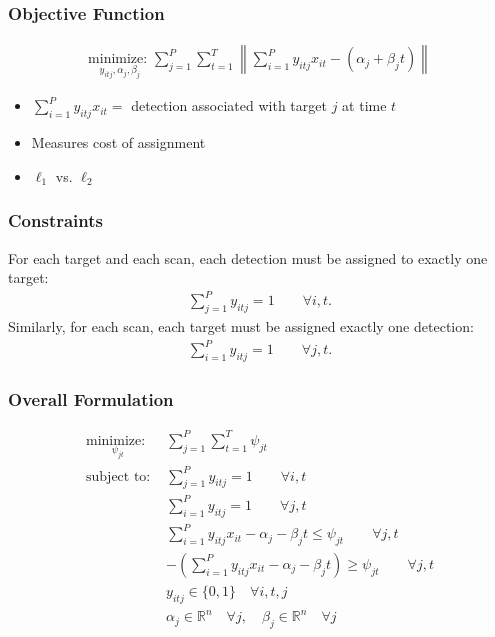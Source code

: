 \documentclass{beamer}
\begin{document}
\begin{frame}
\frametitle{Objective Function}
\begin{align*}
 \underset{y_{itj}, \alpha_{j}, \beta_{j}}{\text{minimize: }}\sum_{j=1}^{P} \sum_{t=1}^{T}  \left \| \sum_{i=1}^{P}y_{itj}x_{it} - (\alpha_{j} + \beta_{j}t) \right \|
\end{align*}
\begin{itemize}
\item $\sum_{i=1}^{P}y_{itj}x_{it} =$ detection associated with target $j$ at time $t$
\item Measures cost of assignment
\item $\ell_{1}$ vs. $\ell_{2}$
\end{itemize}
\end{frame}

\begin{frame}
\frametitle{Constraints}
For each target and each scan, each detection must be assigned to exactly one target:
\begin{align*}
\sum_{j=1}^{P} y_{itj} = 1 \qquad \forall i,t.
\end{align*}
Similarly, for each scan, each target must be assigned exactly one detection:
\begin{align*}\label{eq:all_targets}
\sum_{i=1}^{P} y_{itj} = 1 \qquad \forall j,t.
\end{align*}
\end{frame}

\begin{frame}[shrink=20]
\frametitle{Overall Formulation}
\begin{align*}
\underset{\psi_{jt}}{\text{minimize: }} & \sum_{j=1}^{P} \sum_{t=1}^{T} \psi_{jt}\\
\text{subject to: }	& \sum_{j=1}^{P} y_{itj} = 1 \qquad \forall i,t\nonumber \\
				& \sum_{i=1}^{P} y_{itj} = 1 \qquad \forall j,t\nonumber \\
				& \sum_{i=1}^{P}y_{itj}x_{it} - \alpha_{j} - \beta_{j}t \leq \psi_{jt} \qquad \forall j,t \nonumber \\
				& -\left(\sum_{i=1}^{P}y_{itj}x_{it} - \alpha_{j} - \beta_{j}t\right) \geq \psi_{jt} \qquad \forall j,t \nonumber \\
			 	& y_{itj} \in \{0,1\} \quad \forall i,t,j \nonumber\\
				& \alpha_{j} \in \mathbb{R}^n \quad \forall j,\quad \beta_{j} \in \mathbb{R}^n \quad \forall j \nonumber
\end{align*}
\end{frame}
\end{document}
